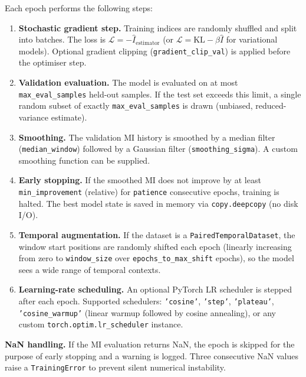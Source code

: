 \documentclass[12pt]{article}
\newcommand{\api}[1]{\texttt{#1}}
\begin{document}
Each epoch performs the following steps:
\begin{enumerate}[leftmargin=*]
  \item \textbf{Stochastic gradient step.}  Training indices are randomly
        shuffled and split into batches.  The loss is
        $\mathcal{L} = -\hat{I}_{\mathrm{estimator}}$ (or
        $\mathcal{L} = \mathrm{KL} - \beta\hat{I}$ for variational models).
        Optional gradient clipping (\api{gradient\_clip\_val}) is applied
        before the optimiser step.

  \item \textbf{Validation evaluation.}  The model is evaluated on at most
        \api{max\_eval\_samples} held-out samples.  If the test set exceeds this
        limit, a single random subset of exactly \api{max\_eval\_samples} is
        drawn (unbiased, reduced-variance estimate).

  \item \textbf{Smoothing.}  The validation MI history is smoothed by a
        median filter (\api{median\_window}) followed by a Gaussian filter
        (\api{smoothing\_sigma}).  A custom smoothing function can be supplied.

  \item \textbf{Early stopping.}  If the smoothed MI does not improve by at
        least \api{min\_improvement} (relative) for \api{patience} consecutive
        epochs, training is halted.  The best model state is saved in memory
        via \api{copy.deepcopy} (no disk I/O).

  \item \textbf{Temporal augmentation.}  If the dataset is a
        \api{PairedTemporalDataset}, the window start positions are randomly
        shifted each epoch (linearly increasing from zero to
        \api{window\_size} over \api{epochs\_to\_max\_shift} epochs), so the
        model sees a wide range of temporal contexts.

  \item \textbf{Learning-rate scheduling.}  An optional PyTorch LR scheduler
        is stepped after each epoch.  Supported schedulers: \api{'cosine'},
        \api{'step'}, \api{'plateau'}, \api{'cosine\_warmup'} (linear warmup
        followed by cosine annealing), or any custom
        \api{torch.optim.lr\_scheduler} instance.
\end{enumerate}

\textbf{NaN handling.}  If the MI evaluation returns NaN, the epoch is
skipped for the purpose of early stopping and a warning is logged.  Three
consecutive NaN values raise a \api{TrainingError} to prevent silent
numerical instability.
\end{document}
